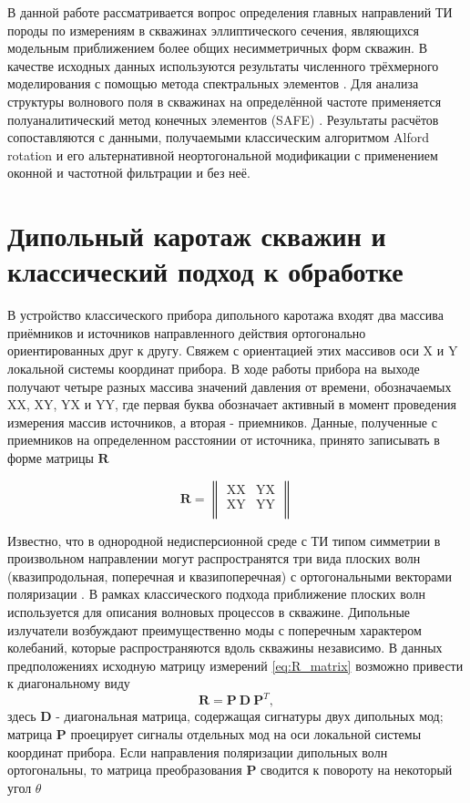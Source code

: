 \documentclass[a4paper,11pt]{article}
\begin{document}
В данной работе рассматривается вопрос определения главных направлений ТИ породы по измерениям в скважинах эллиптического сечения, являющихся модельным приближением более общих несимметричных форм скважин. В качестве исходных данных используются результаты численного трёхмерного моделирования с помощью метода спектральных элементов \cite{Komatitsch2000}. Для анализа структуры волнового поля в скважинах на определённой частоте применяется полуаналитический метод конечных элементов (SAFE) \cite{Bartoli2006}. Результаты расчётов сопоставляются с данными, получаемыми классическим алгоритмом Alford rotation \cite{Alford1986} и его альтернативной неортогональной модификации \cite{Dellinger1998} с применением оконной и частотной фильтрации и без неё.

\section{Дипольный каротаж скважин и классический подход к обработке}
В устройство классического прибора дипольного каротажа входят два массива приёмников и источников направленного действия ортогонально ориентированных друг к другу. Свяжем с ориентацией этих массивов оси X и Y локальной системы координат прибора. В ходе работы прибора на выходе получают четыре разных массива значений давления от времени, обозначаемых XX, XY, YX и YY, где первая буква обозначает активный в момент проведения измерения массив источников, а вторая - приемников. Данные, полученные с приемников на определенном расстоянии от источника, принято записывать в форме матрицы $\mathbf{R}$ 

\begin{equation}
	\mathbf{R} = \left\|
	\begin{array}{cc}
	\text{XX} & \text{YX} \\
	\text{XY} & \text{YY} \\
	\end{array}
	\right\| 
	\label{eq:R_matrix}
\end{equation}

Известно, что в однородной недисперсионной среде с ТИ типом симметрии в произвольном направлении могут распространятся три вида плоских волн (квазипродольная, поперечная и квазипоперечная) с ортогональными векторами поляризации \cite{Musgrave1970}. В рамках классического подхода приближение плоских волн используется для описания волновых процессов в скважине. Дипольные излучатели возбуждают преимущественно моды с поперечным характером колебаний, которые распространяются вдоль скважины независимо. В данных предположениях исходную матрицу измерений \eqref{eq:R_matrix} возможно привести к диагональному виду \cite{Dellinger1998}
\begin{equation}
	\mathbf{R} = \mathbf{P} \ \mathbf{D} \ \mathbf{P}^T, \label{eq:alford_symmetric} 
\end{equation}
здесь $\mathbf{D}$ - диагональная матрица, содержащая сигнатуры двух дипольных мод; матрица $\mathbf{P}$ проецирует сигналы отдельных мод на оси локальной системы координат прибора. Если направления поляризации дипольных волн ортогональны, то матрица преобразования $\mathbf{P}$ сводится к повороту на некоторый угол $\theta$
\end{document}
